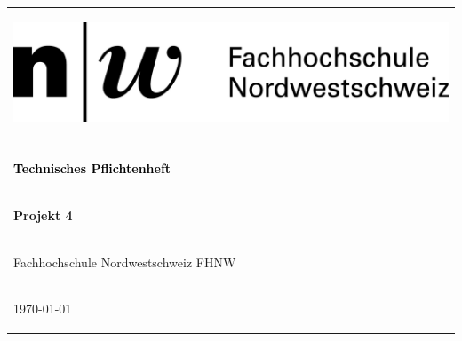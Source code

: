 \thispagestyle{empty}

\begin{center}
\begin{tabular}{p{\textwidth}}

\begin{flushleft}
\includegraphics[scale=1.3]{Bilder/FHNW.png}
\end{flushleft}

\\

\\

\begin{center}
\textcolor{black}{
\textbf{
\Huge{
Technisches Pflichtenheft
}}}
\end{center}

\\

\begin{center}
\Large{
\textbf{
Projekt 4
}}
\end{center}

\\

\begin{center}
\large{
Fachhochschule Nordwestschweiz FHNW
}
\end{center}

\\

\begin{center}
\large{\today}
\end{center}

\vspace*{2cm}


\end{tabular}
\end{center}
